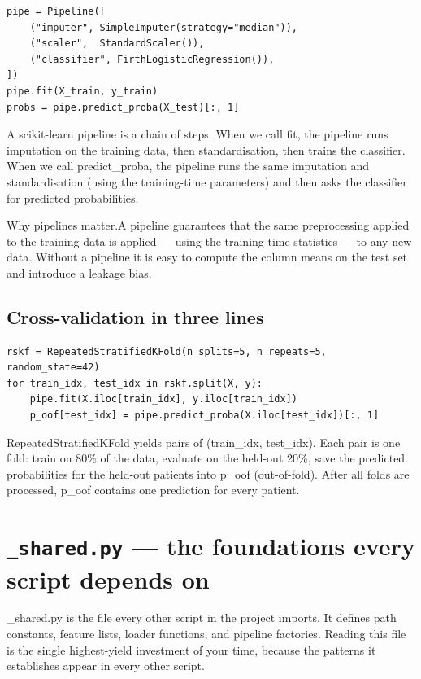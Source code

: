 \documentclass[11pt,a4paper]{article}
\begin{document}
\begin{lstlisting}[style=codeblock]
pipe = Pipeline([
    ("imputer", SimpleImputer(strategy="median")),
    ("scaler",  StandardScaler()),
    ("classifier", FirthLogisticRegression()),
])
pipe.fit(X_train, y_train)
probs = pipe.predict_proba(X_test)[:, 1]
\end{lstlisting}

A scikit-learn pipeline is a chain of steps. When we call fit, the pipeline runs imputation on the training data, then standardisation, then trains the classifier. When we call predict\_proba, the pipeline runs the same imputation and standardisation (using the training-time parameters) and then asks the classifier for predicted probabilities.
\begin{callout}{Why pipelines matter.}A pipeline guarantees that the same preprocessing applied to the training data is applied — using the training-time statistics — to any new data. Without a pipeline it is easy to compute the column means on the test set and introduce a leakage bias.\end{callout}
\subsection{Cross-validation in three lines}

\begin{lstlisting}[style=codeblock]
rskf = RepeatedStratifiedKFold(n_splits=5, n_repeats=5, random_state=42)
for train_idx, test_idx in rskf.split(X, y):
    pipe.fit(X.iloc[train_idx], y.iloc[train_idx])
    p_oof[test_idx] = pipe.predict_proba(X.iloc[test_idx])[:, 1]
\end{lstlisting}

RepeatedStratifiedKFold yields pairs of (train\_idx, test\_idx). Each pair is one fold: train on 80\% of the data, evaluate on the held-out 20\%, save the predicted probabilities for the held-out patients into p\_oof (out-of-fold). After all folds are processed, p\_oof contains one prediction for every patient.
\clearpage
\section{\texttt{\_shared.py} — the foundations every script depends on}
\_shared.py is the file every other script in the project imports. It defines path constants, feature lists, loader functions, and pipeline factories. Reading this file is the single highest-yield investment of your time, because the patterns it establishes appear in every other script.
\end{document}
